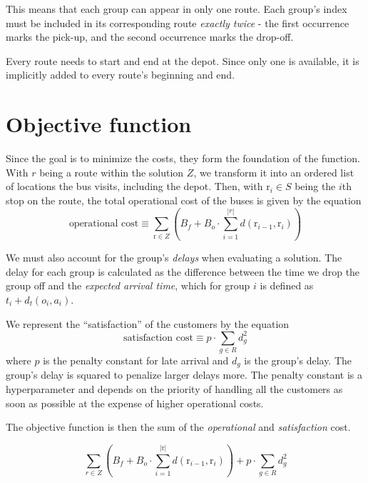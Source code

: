 This means that each group can appear in only one route. Each group's index must be included in its corresponding route \textit{exactly twice} - the first occurrence marks the pick-up, and the second occurrence marks the drop-off.

Every route needs to start and end at the depot. Since only one is available, it is implicitly added to every route's beginning and end.

\section{Objective function}
\label{sec:objective}

Since the goal is to minimize the costs, they form the foundation of the function. With $r$ being a route within the solution $Z$, we transform it into an ordered list of locations the bus visits, including the depot. Then, with $\mathrm{r}_i \in S$ being the $i$th stop on the route, the total operational cost of the buses is given by the equation
\begin{equation}\label{eq:objective_costs}
    \text{operational cost} \equiv \sum_{\mathrm{r} \in Z} ( B_f + B_o \cdot \sum_{i=1}^{|r|}d(\mathrm{r}_{i-1},\mathrm{r}_{i}))
\end{equation}


We must also account for the group's \textit{delays} when evaluating a solution. The delay for each group is calculated as the difference between the time we drop the group off and the \textit{expected arrival time}, which for group $i$ is defined as $t_i + d_t(o_i, a_i)$.

We represent the ``satisfaction'' of the customers by the equation
\begin{equation}\label{eq:objective_satisfaction}
     \text{satisfaction cost} \equiv p \cdot \sum_{g \in R} d_g^2
\end{equation}
where $p$ is the penalty constant for late arrival and $d_g$ is the group's delay. The group's delay is squared to penalize larger delays more. The penalty constant is a hyperparameter and depends on the priority of handling all the customers as soon as possible at the expense of higher operational costs.

The objective function is then the sum of the \textit{operational} and \textit{satisfaction} cost.

\begin{equation}\label{eq:objective}
    \sum_{r \in Z} ( B_f + B_o \cdot \sum_{i=1}^{|\mathrm{r}|}d(\mathrm{r}_{i-1},\mathrm{r}_{i})) + p \cdot \sum_{g \in R} d_g^2
\end{equation}

